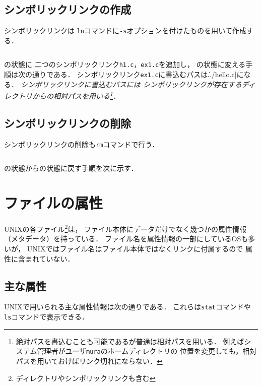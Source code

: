 \subsection*{シンボリックリンクの作成}
シンボリックリンクは
\texttt{ln}コマンドに\texttt{-s}オプションを付けたものを用いて作成する．

\begin{lstlisting}[numbers=none]
% ln -s リンクに書込むパス 作成するリンクのパス
\end{lstlisting}

の状態に
二つのシンボリックリンク\texttt{h1.c}，\texttt{ex1.c}を追加し，
の状態に変える手順は次の通りである．
シンボリックリンク\texttt{ex1.c}に書込むパスは\|../hello.c|になる．
\emph{シンボリックリンクに書込むパスには
シンボリックリンクが存在するディレクトリからの相対パスを用いる\footnote{
絶対パスを書込むことも可能であるが普通は相対パスを用いる．
例えばシステム管理者がユーザ\texttt{mura}のホームディレクトリの
位置を変更しても，相対パスを用いておけばリンク切れにならない．}．}



\subsection*{シンボリックリンクの削除}

シンボリックリンクの削除も\texttt{rm}コマンドで行う．

\begin{lstlisting}[numbers=none]
% rm シンボリックリンクのパス
\end{lstlisting}

の状態からの状態に戻す手順を次に示す．



\section{ファイルの属性}
UNIXの各ファイル\footnote{ディレクトリやシンボリックリンクも含む}は，
ファイル本体にデータだけでなく幾つかの属性情報（メタデータ）を持っている．
ファイル名を属性情報の一部にしているOSも多いが，
UNIXではファイル名はファイル本体ではなくリンクに付属するので
属性に含まれていない．

\subsection{主な属性}
UNIXで用いられる主な属性情報は次の通りである．
これらは\texttt{stat}コマンドや\texttt{ls}コマンドで表示できる．

